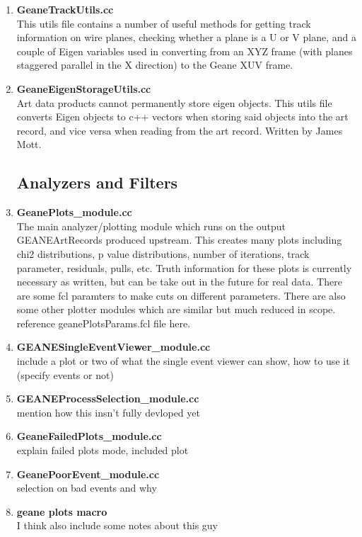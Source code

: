 \documentclass{article}
\begin{document}
\begin{enumerate}
\begin{itemize}
        \end{itemize}
/////////////////////////////////////////////////////////////////////////////////////

      \item{\bf{GeaneTrackUtils.cc}} \\
      This utils file contains a number of useful methods for getting track information on wire planes, checking whether a plane is a U or V plane, and a couple of Eigen variables used in converting from an XYZ frame (with planes staggered parallel in the X direction) to the Geane XUV frame.

      \item{\bf{GeaneEigenStorageUtils.cc}} \\
      Art data products cannot permanently store eigen objects. This utils file converts Eigen objects to c++ vectors when storing said objects into the art record, and vice versa when reading from the art record. Written by James Mott.



  \subsection{Analyzers and Filters}


      \item{\bf{GeanePlots\_module.cc}} \\
      The main analyzer/plotting module which runs on the output GEANEArtRecords produced upstream. This creates many plots including chi2 distributions, p value distributions, number of iterations, track parameter, residuals, pulls, etc. Truth information for these plots is currently necessary as written, but can be take out in the future for real data. There are some fcl paramters to make cuts on different parameters. There are also some other plotter modules which are similar but much reduced in scope. reference geanePlotsParams.fcl file here.

      \item{\bf{GEANESingleEventViewer\_module.cc}} \\
      include a plot or two of what the single event viewer can show, how to use it (specify events or not)

      \item{\bf{GEANEProcessSelection\_module.cc}} \\
      mention how this insn't fully devloped yet

      \item{\bf{GeaneFailedPlots\_module.cc}} \\
      explain failed plots mode, included plot

      \item{\bf{GeanePoorEvent\_module.cc}} \\
      selection on bad events and why

      \item{\bf{geane plots macro}} \\
      I think also include some notes about this guy

    \end{enumerate}
\end{document}
